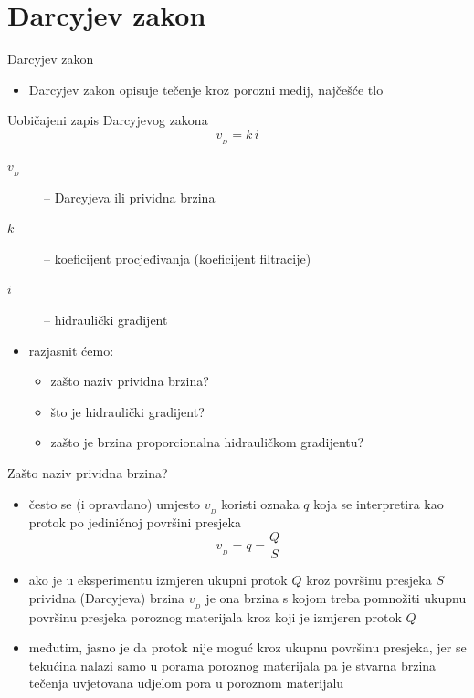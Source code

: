 \documentclass[croatian]{beamer}
\begin{document}
\naslovnislajd

\section{Darcyjev zakon}
\begin{frame}{Darcyjev zakon}
\begin{itemize}
\item Darcyjev zakon opisuje tečenje kroz porozni medij, najčešće tlo 
\end{itemize}
\begin{block}{Uobičajeni zapis Darcyjevog zakona}
\[
v_{{\scriptscriptstyle _{D}}}=k\,i
\]
\begin{description}
\item [{$v_{{\scriptscriptstyle _{D}}}$}] -- Darcyjeva ili prividna brzina 
\item [{$k$}] -- koeficijent procjeđivanja (koeficijent filtracije) 
\item [{$i$}] -- hidraulički gradijent \smallskip{}
\end{description}
\end{block}
\begin{itemize}
\item razjasnit ćemo:
\begin{itemize}
\item zašto naziv prividna brzina? 
\item što je hidraulički gradijent? 
\item zašto je brzina proporcionalna hidrauličkom gradijentu? 
\end{itemize}
\end{itemize}
\end{frame}
%
\begin{frame}{Zašto naziv prividna brzina?}
\begin{itemize}
\item često se (i opravdano) umjesto $v_{{\scriptscriptstyle _{D}}}$ koristi
oznaka $q$ koja se interpretira kao protok po jediničnoj površini
presjeka 
\[
v_{{\scriptscriptstyle _{D}}}=q=\frac{Q}{S}
\]
\item ako je u eksperimentu izmjeren ukupni protok $Q$ kroz površinu presjeka
$S$ prividna (Darcyjeva) brzina $v_{{\scriptscriptstyle _{D}}}$
je ona brzina s kojom treba pomnožiti ukupnu površinu presjeka poroznog
materijala kroz koji je izmjeren protok $Q$ 
\item međutim, jasno je da protok nije moguć kroz ukupnu površinu presjeka,
jer se tekućina nalazi samo u porama poroznog materijala pa je stvarna
brzina tečenja uvjetovana udjelom pora u poroznom materijalu 
\end{itemize}
\end{frame}
\end{document}
